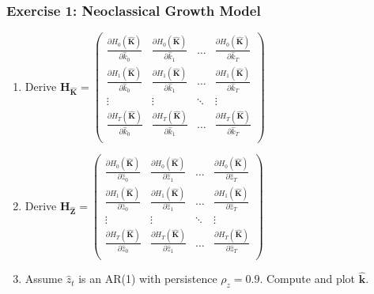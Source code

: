 \documentclass[english,xcolor=svgnames]{beamer}
\begin{document}
		
		



\begin{frame}
	\frametitle{Exercise 1: Neoclassical Growth Model}
	\begin{enumerate}
		\item Derive $\mathbf{H}_\mathbf{\hat{K}} = \begin{pmatrix}
			\frac{\partial H_0(\mathbf{\hat{K}})}{\partial \hat{k}_0} & \frac{\partial H_0(\mathbf{\hat{K}})}{\partial \hat{k}_1} & \hdots & \frac{\partial H_0(\mathbf{\hat{K}})}{\partial \hat{k}_T} \\
			\frac{\partial H_1(\mathbf{\hat{K}})}{\partial \hat{k}_0} & \frac{\partial H_1(\mathbf{\hat{K}})}{\partial \hat{k}_1} & \hdots & \frac{\partial H_1(\mathbf{\hat{K}})}{\partial \hat{k}_T} \\
			\vdots & \vdots & \ddots & \vdots \\
			\frac{\partial H_T(\mathbf{\hat{K}})}{\partial \hat{k}_0} & \frac{\partial H_T(\mathbf{\hat{K}})}{\partial \hat{k}_1} & \hdots & \frac{\partial H_T(\mathbf{\hat{K}})}{\partial \hat{k}_T} \\
		\end{pmatrix}$
		\item Derive $\mathbf{H}_\mathbf{\hat{Z}} = \begin{pmatrix}
			\frac{\partial H_0(\mathbf{\hat{K}})}{\partial \hat{z}_0} & \frac{\partial H_0(\mathbf{\hat{K}})}{\partial \hat{z}_1} & \hdots & \frac{\partial H_0(\mathbf{\hat{K}})}{\partial \hat{z}_T} \\
			\frac{\partial H_1(\mathbf{\hat{K}})}{\partial \hat{z}_0} & \frac{\partial H_1(\mathbf{\hat{K}})}{\partial \hat{z}_1} & \hdots & \frac{\partial H_1(\mathbf{\hat{K}})}{\partial \hat{z}_T} \\
			\vdots & \vdots & \ddots & \vdots \\
			\frac{\partial H_T(\mathbf{\hat{K}})}{\partial \hat{z}_0} & \frac{\partial H_T(\mathbf{\hat{K}})}{\partial \hat{z}_1} & \hdots & \frac{\partial H_T(\mathbf{\hat{K}})}{\partial \hat{z}_T} \\
		\end{pmatrix}$
		\item Assume $\hat{z}_t$ is an AR(1) with persistence $\rho_z = 0.9$. Compute and plot $\mathbf{\hat{k}}$.
	 \end{enumerate}
 \end{frame}
\end{document}
